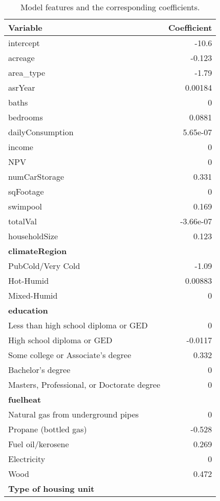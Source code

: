 	
\begin{table}[H]
	\centering
	\scriptsize
    \caption{Model features and the corresponding coefficients.}
	\begin{tabular}{|p{6cm}|r|}
		\hline
		Variable & Coefficient \\ 
		\hline
		\hline
		intercept & -10.6 \\ 
		\hline
		acreage & -0.123 \\ 
		\hline
		area\_type & -1.79 \\ 
		\hline
		asrYear & 0.00184 \\
		\hline 
		baths &    0 \\ 
		\hline
		bedrooms & 0.0881 \\ 
		\hline
		dailyConsumption & 5.65e-07 \\ 
		\hline
		income &    0 \\ 
		\hline
		NPV &    0 \\ 
		\hline
		numCarStorage & 0.331 \\ 
		\hline
		sqFootage &    0 \\ 
		\hline
		swimpool & 0.169 \\ 
		\hline
		totalVal & -3.66e-07 \\  
		\hline
		householdSize & 0.123 \\ 
		\hline
		\textbf{climateRegion} & \\
		PubCold/Very Cold & -1.09 \\ 
		Hot-Humid & 0.00883 \\ 
		Mixed-Humid &    0 \\ 
		\hline
		\textbf{education} & \\
		Less than high school diploma or GED & 0 \\
		High school diploma or GED  & -0.0117 \\ 
		Some college or Associate’s degree  & 0.332 \\ 
		Bachelor’s degree  &    0 \\ 
		Masters, Professional, or Doctorate degree  &    0 \\ 
		\hline
		\textbf{fuelheat} & \\
		Natural gas from underground pipes  & 0 \\ 
		Propane (bottled gas)  & -0.528 \\ 
		Fuel oil/kerosene  & 0.269 \\ 
		Electricity  &    0 \\ 
		Wood  & 0.472 \\ 
		\hline
		\textbf{Type of housing unit} & \\

\end{tabular}
\end{table}
